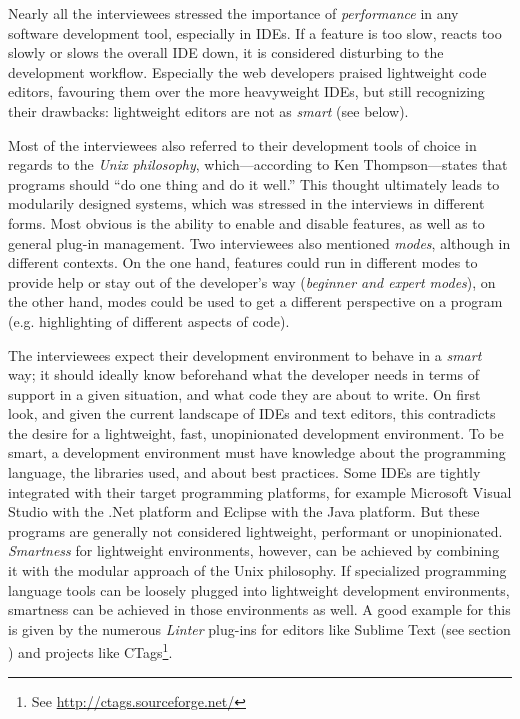 Nearly all the interviewees stressed the importance of
\emph{performance} in any software development tool, especially in IDEs.
If a feature is too slow, reacts too slowly or slows the overall IDE
down, it is considered disturbing to the development workflow.
Especially the web developers praised lightweight code editors,
favouring them over the more heavyweight IDEs, but still recognizing
their drawbacks: lightweight editors are not as \emph{smart} (see
below).

Most of the interviewees also referred to their development tools of
choice in regards to the \emph{Unix philosophy}, which—according to Ken
Thompson—states that programs should “do one thing and do it well.”
\cite{raymond} This thought ultimately leads to modularily designed
systems, which was stressed in the interviews in different forms. Most
obvious is the ability to enable and disable features, as well as to
general plug-in management. Two interviewees also mentioned
\emph{modes}, although in different contexts. On the one hand, features
could run in different modes to provide help or stay out of the
developer’s way (\emph{beginner and expert modes}), on the other hand,
modes could be used to get a different perspective on a program (e.g.
highlighting of different aspects of code).

The interviewees expect their development environment to behave in a
\emph{smart} way; it should ideally know beforehand what the developer
needs in terms of support in a given situation, and what code they are
about to write. On first look, and given the current landscape of IDEs
and text editors, this contradicts the desire for a lightweight, fast,
unopinionated development environment. To be smart, a development
environment must have knowledge about the programming language, the
libraries used, and about best practices. Some IDEs are tightly
integrated with their target programming platforms, for example
Microsoft Visual Studio with the .Net platform and Eclipse with the Java
platform. But these programs are generally not considered lightweight,
performant or unopinionated. \emph{Smartness} for lightweight
environments, however, can be achieved by combining it with the modular
approach of the Unix philosophy. If specialized programming language
tools can be loosely plugged into lightweight development environments,
smartness can be achieved in those environments as well. A good example
for this is given by the numerous \emph{Linter} plug-ins for editors
like Sublime Text (see section ) and projects like
CTags\footnote{See \url{http://ctags.sourceforge.net/}}.

